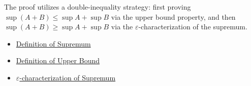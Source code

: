 \begin{remark*}
The proof utilizes a double-inequality strategy: first proving $\sup(A+B) \le \sup A + \sup B$ via the upper bound property, and then $\sup(A+B) \ge \sup A + \sup B$ via the $\varepsilon$-characterization of the supremum.
\end{remark*}

\begin{dependencies}
\begin{itemize}
  \item \hyperref[def:supremum]{Definition of Supremum}
  \item \hyperref[def:upper-bound]{Definition of Upper Bound}
  \item \hyperref[def:epsilon-characterization-of-supremum]{$\varepsilon$-characterization of Supremum}
\end{itemize}
\end{dependencies}

\clearpage

